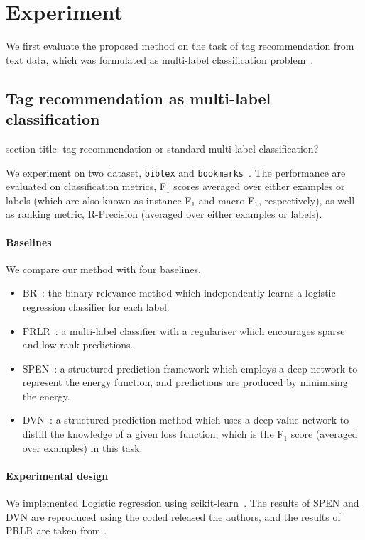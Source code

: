 \clearpage
\newpage

\section{Experiment}
\label{sec:experiment}

We first evaluate the proposed method on the task of tag recommendation from text data,
which was formulated as multi-label classification problem~\cite{katakis2008multilabel}.

\subsection{Tag recommendation as multi-label classification}
\label{ssec:mlc}
\TODO section title: tag recommendation or standard multi-label classification?

We experiment on two dataset, \texttt{bibtex} and \texttt{bookmarks}~\cite{katakis2008multilabel}.
The performance are evaluated on classification metrics, \ie F$_1$ scores averaged over either examples or labels 
(which are also known as instance-F$_1$ and macro-F$_1$, respectively),
as well as ranking metric, \ie R-Precision (averaged over either examples or labels).

\paragraph{Baselines}
We compare our method with four baselines.
\begin{itemize}
\item BR~\cite{tsoumakas2006multi}: the binary relevance method which independently learns a logistic regression classifier for each label.
\item PRLR~\cite{lin2014multi}: a multi-label classifier with a regulariser which encourages sparse and low-rank predictions.
\item SPEN~\cite{belanger2016structured}: a structured prediction framework which employs a deep network to represent the energy function,
      and predictions are produced by minimising the energy.
\item DVN~\cite{gygli2017deep}: a structured prediction method which uses a deep value network to distill the knowledge of a given loss function,
      which is the F$_1$ score (averaged over examples) in this task.
\end{itemize}

\paragraph{Experimental design}
We implemented Logistic regression using scikit-learn~\cite{scikit-learn}.
The results of SPEN and DVN are reproduced using the coded released the authors,
and the results of PRLR are taken from \cite{lin2014multi}.

